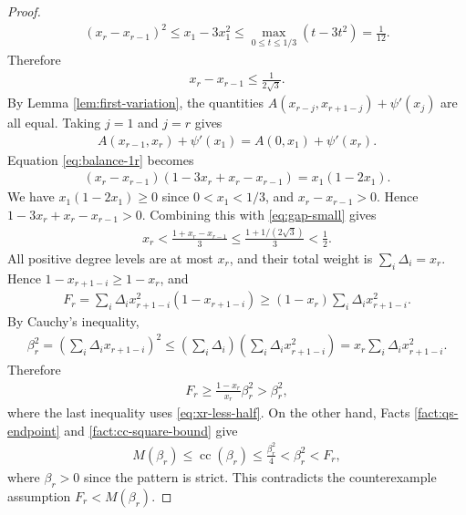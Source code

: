 \documentclass[10pt,a4paper]{article}
\newcommand{\cc}{\operatorname{cc}}
\begin{document}
\begin{proof}
\begin{align*}
  (x_r-x_{r-1})^2\le x_1-3x_1^2\le \max_{0\le t\le1/3}(t-3t^2)=\frac1{12}.
\end{align*}
Therefore
\begin{align}\label{eq:gap-small}
  x_r-x_{r-1}\le\frac1{2\sqrt3}.
\end{align}
By Lemma \ref{lem:first-variation}, the quantities $A(x_{r-j},x_{r+1-j})+\psi'(x_j)$ are all equal.  Taking $j=1$ and $j=r$ gives
\begin{align}\label{eq:balance-1r}
  A(x_{r-1},x_r)+\psi'(x_1)=A(0,x_1)+\psi'(x_r).
\end{align}
Equation \eqref{eq:balance-1r} becomes
\begin{align}\label{eq:balance-simplified}
  (x_r-x_{r-1})(1-3x_r+x_r-x_{r-1})=x_1(1-2x_1).
\end{align}
We have $x_1(1-2x_1)\ge0$ since $0<x_1<1/3$, and $x_r-x_{r-1}>0$.  Hence
$
  1-3x_r+x_r-x_{r-1}>0.
$
Combining this with \eqref{eq:gap-small} gives
\begin{align}\label{eq:xr-less-half}
  x_r<\frac{1+x_r-x_{r-1}}{3}
  \le \frac{1+1/(2\sqrt3)}{3}<\frac12.
\end{align}
All positive degree levels are at most $x_r$, and their total weight is $\sum_i\Delta_i=x_r$.  Hence $1-x_{r+1-i}\ge1-x_r$, and
\begin{align*}
  F_r=\sum_i \Delta_i x_{r+1-i}^2(1-x_{r+1-i})
  \ge (1-x_r)\sum_i \Delta_i x_{r+1-i}^2.
\end{align*}
By Cauchy's inequality,
\begin{align*}
  \beta_r^2=\left(\sum_i\Delta_i x_{r+1-i}\right)^2
  \le\left(\sum_i\Delta_i\right)\left(\sum_i\Delta_i x_{r+1-i}^2\right)
  =x_r\sum_i\Delta_i x_{r+1-i}^2.
\end{align*}
Therefore
\begin{align}\label{eq:F-ge-beta-square}
  F_r\ge \frac{1-x_r}{x_r}\beta_r^2>\beta_r^2,
\end{align}
where the last inequality uses \eqref{eq:xr-less-half}.  On the other hand, Facts \ref{fact:qs-endpoint} and \ref{fact:cc-square-bound} give
\begin{align*}
  M(\beta_r)\le\cc(\beta_r)\le\frac{\beta_r^2}{4}<\beta_r^2<F_r,
\end{align*}
where $\beta_r>0$ since the pattern is strict.  This contradicts the counterexample assumption $F_r<M(\beta_r)$.
\end{proof}
\end{document}
